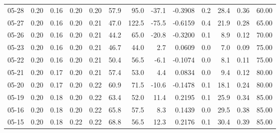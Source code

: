 \begin{threeparttable}
{\begin{tabular}{lrrrrrrrrrrrr}
  05-28 &          0.20 &          0.16 &          0.20 &        0.20 &                57.9 &                95.0 &      -37.1 &      -0.3908 &                 0.2 &             28.4 &            0.36 &                  60.00 \\
  05-27 &          0.20 &          0.16 &          0.20 &        0.21 &                47.0 &               122.5 &      -75.5 &      -0.6159 &                 0.4 &             21.9 &            0.28 &                  65.00 \\
  05-26 &          0.20 &          0.16 &          0.20 &        0.21 &                44.2 &                65.0 &      -20.8 &      -0.3200 &                 0.1 &              8.9 &            0.12 &                  70.00 \\
  05-23 &          0.20 &          0.16 &          0.20 &        0.21 &                46.7 &                44.0 &        2.7 &       0.0609 &                 0.0 &              7.0 &            0.09 &                  75.00 \\
  05-22 &          0.20 &          0.16 &          0.20 &        0.21 &                50.4 &                56.5 &       -6.1 &      -0.1074 &                 0.0 &              8.1 &            0.11 &                  75.00 \\
  05-21 &          0.20 &          0.17 &          0.20 &        0.21 &                57.4 &                53.0 &        4.4 &       0.0834 &                 0.0 &              9.4 &            0.12 &                  80.00 \\
  05-20 &          0.20 &          0.17 &          0.20 &        0.22 &                60.9 &                71.5 &      -10.6 &      -0.1478 &                 0.1 &             18.1 &            0.24 &                  80.00 \\
  05-19 &          0.20 &          0.18 &          0.20 &        0.22 &                63.4 &                52.0 &       11.4 &       0.2195 &                 0.1 &             25.9 &            0.34 &                  85.00 \\
  05-16 &          0.20 &          0.18 &          0.20 &        0.22 &                65.8 &                57.5 &        8.3 &       0.1439 &                 0.0 &             29.5 &            0.38 &                  85.00 \\
  05-15 &          0.20 &          0.18 &          0.22 &        0.22 &                68.8 &                56.5 &       12.3 &       0.2176 &                 0.1 &             30.4 &            0.39 &                  85.00 \\

\end{tabular}}
\end{threeparttable}
